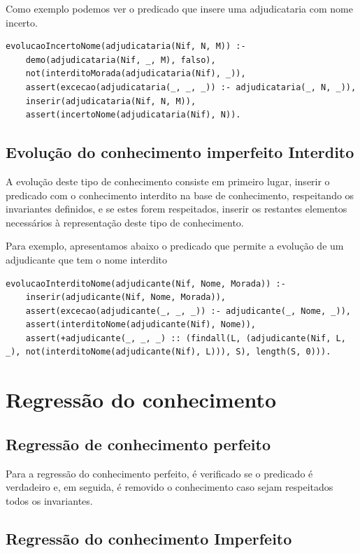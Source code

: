 \documentclass[a4paper]{report}
\begin{document}
Como exemplo podemos ver o predicado que insere uma adjudicataria com nome
incerto.

\begin{verbatim}
evolucaoIncertoNome(adjudicataria(Nif, N, M)) :-
    demo(adjudicataria(Nif, _, M), falso),
    not(interditoMorada(adjudicataria(Nif), _)),
    assert(excecao(adjudicataria(_, _, _)) :- adjudicataria(_, N, _)),
    inserir(adjudicataria(Nif, N, M)),
    assert(incertoNome(adjudicataria(Nif), N)).
\end{verbatim}

\subsection{Evolução do conhecimento imperfeito Interdito}

A evolução deste tipo de conhecimento consiste em primeiro lugar, inserir o
predicado com o conhecimento interdito na base de conhecimento, respeitando os
invariantes definidos, e se estes forem respeitados, inserir os restantes
elementos necessários à representação deste tipo de conhecimento.

Para exemplo, apresentamos abaixo o predicado que permite a evolução de um
adjudicante que tem o nome interdito

\begin{verbatim}
evolucaoInterditoNome(adjudicante(Nif, Nome, Morada)) :-
    inserir(adjudicante(Nif, Nome, Morada)),
    assert(excecao(adjudicante(_, _, _)) :- adjudicante(_, Nome, _)),
    assert(interditoNome(adjudicante(Nif), Nome)),
    assert(+adjudicante(_, _, _) :: (findall(L, (adjudicante(Nif, L, _), not(interditoNome(adjudicante(Nif), L))), S), length(S, 0))).
\end{verbatim}

\section{Regressão do conhecimento}

\subsection{Regressão de conhecimento perfeito}

Para a regressão do conhecimento perfeito, é verificado se o predicado é
verdadeiro e, em seguida, é removido o conhecimento caso sejam respeitados todos
os invariantes.

\subsection{Regressão do conhecimento Imperfeito}
\end{document}
